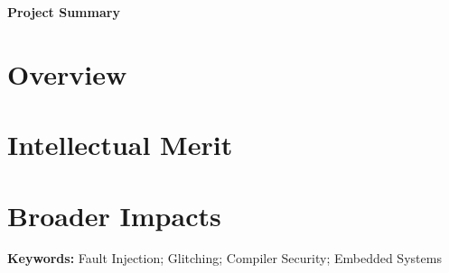 \documentclass[11pt,oneside,onecolumn,letterpaper]{article}
\begin{document}
\normalsize

\renewcommand{\baselinestretch}{1.2}
\normalsize
\centerline{\textbf{\Large Project Summary}}
\vspace{0.1in}

\renewcommand{\baselinestretch}{1.0}
\normalsize


\section*{Overview}

\section*{Intellectual Merit}

\section*{Broader Impacts}

\textbf{Keywords:} Fault Injection; Glitching; Compiler Security; Embedded Systems

\setcounter{page}{1} \normalsize
\end{document}
